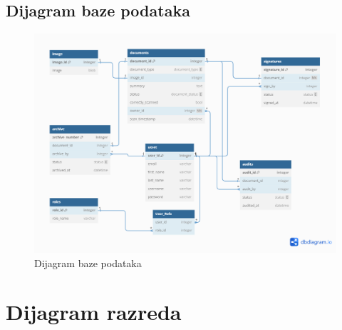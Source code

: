				
			
			\subsection{Dijagram baze podataka}
				
				\begin{figure}[H]
					\includegraphics[width=\textwidth]{slike/dijagramBaze.PNG} 
					\caption{Dijagram baze podataka}
					\label{fig:dijagramBaze}
				\end{figure}
			
			\eject
			
			
		\section{Dijagram razreda}
		
			
			
			
